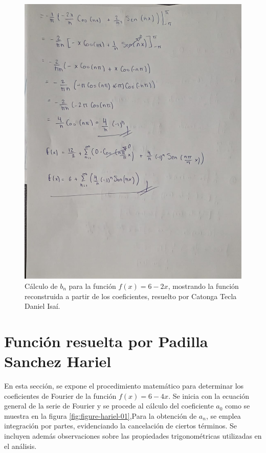 {\begin{figure}[H]
    \centering
    \includegraphics[width=\linewidth]{Figures/fourierDaniel/fourierDaniel4.jpg}
    \caption[Cálculo de \(b_n\) para \(f(x) = 6 - 2x\)]{Cálculo de \(b_n\) para la función \(f(x) = 6 - 2x\), mostrando la función reconstruida a partir de los coeficientes, resuelto por Catonga Tecla Daniel Isaí.}
    \label{fig:figure-daniel-04}
\end{figure}


\newpage
\section{Función resuelta por Padilla Sanchez Hariel }
     En esta sección, se expone el procedimiento matemático para determinar los coeficientes de Fourier de la función \(f(x)=6-4x\). Se inicia con la ecuación general de la serie de Fourier y se procede al cálculo del coeficiente \(a_0\) como se muestra en la figura \ref{fig:figure-hariel-01},Para la obtención de \(a_n\), se emplea integración por partes, evidenciando la cancelación de ciertos términos. Se incluyen además observaciones sobre las propiedades trigonométricas utilizadas en el análisis.

}
